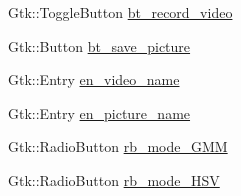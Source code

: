 \begin{DoxyCompactItemize}
\item 
Gtk\+::\+Toggle\+Button \hyperlink{class_vision_g_u_i_a19751ae6ddc4bef7fcc0edee42820714}{bt\+\_\+record\+\_\+video}
\item 
Gtk\+::\+Button \hyperlink{class_vision_g_u_i_afe4bb4a504f404134cc5887e3c352ab4}{bt\+\_\+save\+\_\+picture}
\item 
Gtk\+::\+Entry \hyperlink{class_vision_g_u_i_ab09e0f327e58a9d8e10ae343037a3ce2}{en\+\_\+video\+\_\+name}
\item 
Gtk\+::\+Entry \hyperlink{class_vision_g_u_i_aea52285dc471a5611d8170d162ef3210}{en\+\_\+picture\+\_\+name}
\item 
Gtk\+::\+Radio\+Button \hyperlink{class_vision_g_u_i_aef9153130a527b6fae636466cd3ef77f}{rb\+\_\+mode\+\_\+\+G\+MM}
\item 
Gtk\+::\+Radio\+Button \hyperlink{class_vision_g_u_i_a43f330d4bc43b11333bb90b3e9f3cc2a}{rb\+\_\+mode\+\_\+\+H\+SV}
\end{DoxyCompactItemize}
